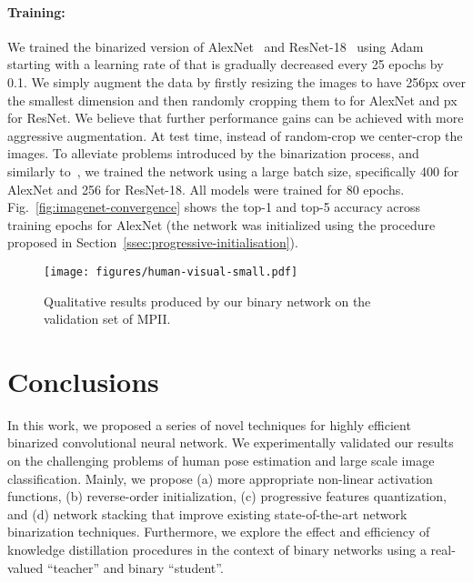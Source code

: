 \documentclass[10pt,twocolumn,letterpaper]{article}
\begin{document}
\paragraph{Training:} We trained the binarized version of AlexNet~\cite{krizhevsky2012imagenet} and ResNet-18~\cite{he2016deep} using Adam~\cite{kingma2014adam} starting with a learning rate of  that is gradually decreased every 25 epochs by 0.1. We simply augment the data by firstly resizing the images to have 256px over the smallest dimension and then randomly cropping them to  for AlexNet and px for ResNet. We believe that further performance gains can be achieved with more aggressive augmentation. At test time, instead of random-crop we center-crop the images. To alleviate problems introduced by the binarization process, and similarly to~\cite{rastegari2016xnor}, we trained the network using a large batch size, specifically 400 for AlexNet and 256 for ResNet-18. All models were trained for 80 epochs. Fig.~\ref{fig:imagenet-convergence} shows the top-1 and top-5 accuracy across training epochs for AlexNet (the network was initialized using the procedure proposed in Section~\ref{ssec:progressive-initialisation}).













\begin{figure}[!h]
    \centering
    \texttt{[image: figures/human-visual-small.pdf]}
    \caption{Qualitative results produced by our binary network on the validation set of MPII.}
    \label{fig:examples-human}
\end{figure}


\section{Conclusions}

In this work, we proposed a series of novel techniques for highly efficient binarized convolutional neural network. We experimentally validated our results on the challenging problems of human pose estimation and large scale image classification. Mainly, we propose (a) more appropriate non-linear activation functions, (b) reverse-order initialization, (c) progressive features quantization, and (d) network stacking that improve existing state-of-the-art network binarization techniques. Furthermore, we explore the effect and efficiency of knowledge distillation procedures in the context of binary networks using a real-valued ``teacher'' and binary ``student''.
\end{document}
